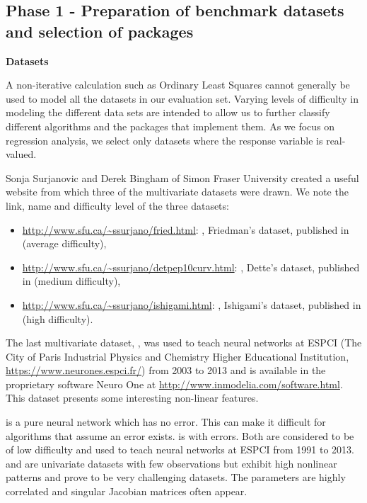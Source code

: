 \hypertarget{phase-1---preparation-of-benchmark-datasets-and-selection-of-packages}{%
\subsection{Phase 1 - Preparation of benchmark datasets and selection of
packages}\label{phase-1---preparation-of-benchmark-datasets-and-selection-of-packages}}

\textbf{Datasets}

A non-iterative calculation such as Ordinary Least Squares cannot
generally be used to model all the datasets in our evaluation set.
Varying levels of difficulty in modeling the different data sets are
intended to allow us to further classify different algorithms and the
packages that implement them. As we focus on regression analysis, we
select only datasets where the response variable is real-valued.

Sonja Surjanovic and Derek Bingham of Simon Fraser University created a
useful website from which three of the multivariate datasets were drawn.
We note the link, name and difficulty level of the three datasets:

\begin{itemize}
\tightlist
\item
  \url{http://www.sfu.ca/~ssurjano/fried.html}: ,
  Friedman's dataset, published in \citep{friedman91} (average
  difficulty),\\
\item
  \url{http://www.sfu.ca/~ssurjano/detpep10curv.html}: ,
  Dette's dataset, published in \citep{dettePepelyshev10} (medium
  difficulty),\\
\item
  \url{http://www.sfu.ca/~ssurjano/ishigami.html}: ,
  Ishigami's dataset, published in \citep{ishigamietal90} (high
  difficulty).
\end{itemize}

The last multivariate dataset, , was used to teach neural
networks at ESPCI (The City of Paris Industrial Physics and Chemistry
Higher Educational Institution, \url{https://www.neurones.espci.fr/})
from 2003 to 2013 and is available in the proprietary software Neuro One
at \url{http://www.inmodelia.com/software.html}. This dataset presents
some interesting non-linear features.

 is a pure neural network which has no error. This can
make it difficult for algorithms that assume an error exists.
 is  with errors. Both are considered to
be of low difficulty and used to teach neural networks at ESPCI from
1991 to 2013.  and  are univariate datasets
with few observations but exhibit high nonlinear patterns and prove to
be very challenging datasets. The parameters are highly correlated and
singular Jacobian matrices often appear.

